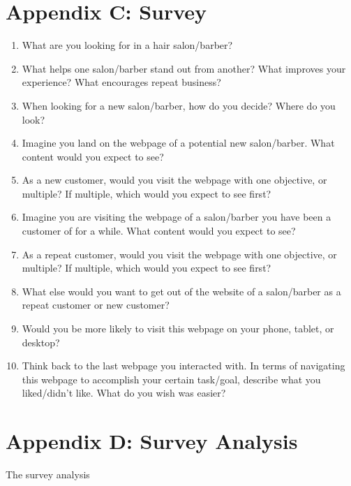 \section{Appendix C: Survey}
\begin{enumerate}
\item
  What are you looking for in a hair salon/barber?
\item
  What helps one salon/barber stand out from another? What improves your experience? What encourages repeat business?
\item
  When looking for a new salon/barber, how do you decide? Where do you look?
\item
  Imagine you land on the webpage of a potential new salon/barber. What content would you expect to see?
\item
  As a new customer, would you visit the webpage with one objective, or multiple? If multiple, which would you expect to see first?
\item
  Imagine you are visiting the webpage of a salon/barber you have been a customer of for a while. What content would you expect to see?
\item
  As a repeat customer, would you visit the webpage with one objective, or multiple? If multiple, which would you expect to see first?
\item
  What else would you want to get out of the website of a salon/barber as a repeat customer or new customer?
\item
  Would you be more likely to visit this webpage on your phone, tablet, or desktop?
\item
  Think back to the last webpage you interacted with. In terms of navigating this webpage to accomplish your certain task/goal, describe what you liked/didn't like. What do you wish was easier?
\end{enumerate}


\section{Appendix D: Survey Analysis}
The survey analysis



